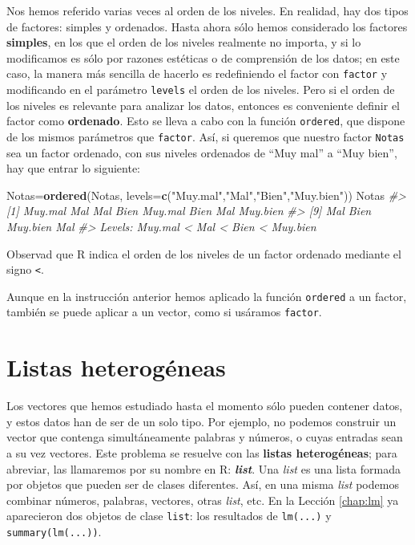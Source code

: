 \documentclass[
]{book}
\newenvironment{Shaded}{\begin{snugshade}}{\end{snugshade}}
\newcommand{\CommentTok}[1]{\textcolor[rgb]{0.56,0.35,0.01}{\textit{#1}}}
\newcommand{\DataTypeTok}[1]{\textcolor[rgb]{0.13,0.29,0.53}{#1}}
\newcommand{\KeywordTok}[1]{\textcolor[rgb]{0.13,0.29,0.53}{\textbf{#1}}}
\newcommand{\NormalTok}[1]{#1}
\newcommand{\StringTok}[1]{\textcolor[rgb]{0.31,0.60,0.02}{#1}}
\theoremstyle{definition}
\theoremstyle{definition}
\theoremstyle{definition}
\theoremstyle{remark}
\begin{document}
Nos hemos referido varias veces al orden de los niveles. En realidad, hay dos tipos de factores: simples y ordenados. Hasta ahora sólo hemos considerado los factores \textbf{simples}, en los que el orden de los niveles realmente no importa, y si lo modificamos es sólo por razones estéticas o de comprensión de los datos; en este caso, la manera más sencilla de hacerlo es redefiniendo el factor con \texttt{factor} y modificando en el parámetro \texttt{levels} el orden de los niveles.
Pero si el orden de los niveles es relevante para analizar los datos, entonces es conveniente definir el factor como \textbf{ordenado}. Esto se lleva a cabo con la función \texttt{ordered}, que dispone de los mismos parámetros que \texttt{factor}. Así, si queremos que nuestro factor \texttt{Notas} sea un factor ordenado, con sus niveles ordenados de ``Muy mal'' a ``Muy bien'', hay que entrar lo siguiente:

\begin{Shaded}
\begin{Highlighting}[]
\NormalTok{Notas=}\KeywordTok{ordered}\NormalTok{(Notas, }\DataTypeTok{levels=}\KeywordTok{c}\NormalTok{(}\StringTok{"Muy.mal"}\NormalTok{,}\StringTok{"Mal"}\NormalTok{,}\StringTok{"Bien"}\NormalTok{,}\StringTok{"Muy.bien"}\NormalTok{))}
\NormalTok{Notas}
\CommentTok{\#\textgreater{}  [1] Muy.mal  Mal      Mal      Bien     Muy.mal  Bien     Mal      Muy.bien}
\CommentTok{\#\textgreater{}  [9] Mal      Bien     Muy.bien Mal     }
\CommentTok{\#\textgreater{} Levels: Muy.mal \textless{} Mal \textless{} Bien \textless{} Muy.bien}
\end{Highlighting}
\end{Shaded}

Observad que R indica el orden de los niveles de un factor ordenado mediante el signo \texttt{\textless{}}.

Aunque en la instrucción anterior hemos aplicado la función \texttt{ordered} a un factor, también se puede aplicar a un vector, como si usáramos \texttt{factor}.

\hypertarget{sec:lists}{%
\section{Listas heterogéneas}\label{sec:lists}}

Los vectores que hemos estudiado hasta el momento sólo pueden contener datos, y estos datos han de ser de un solo tipo. Por ejemplo, no podemos construir un vector que contenga simultáneamente palabras y números, o cuyas entradas sean a su vez vectores. Este problema se resuelve con las \textbf{listas heterogéneas}; para abreviar, las llamaremos por su nombre en R: \textbf{\emph{list}}. Una \emph{list} es una lista formada por objetos que pueden ser de clases diferentes. Así, en una misma \emph{list} podemos combinar números, palabras, vectores, otras \emph{list}, etc. En la Lección \ref{chap:lm} ya aparecieron dos objetos de clase \texttt{list}: los resultados de \texttt{lm(...)} y \texttt{summary(lm(...))}.
\end{document}
